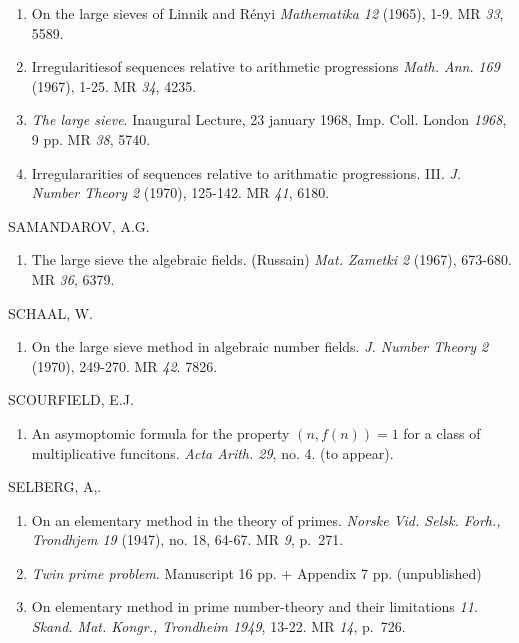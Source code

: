 \begin{thebibliography}{99}
\begin{enumerate}
\item On the  large sieves of Linnik and R\'{e}nyi
  \textit{Mathematika 12} (1965), 1-9. MR {\em 33}, 5589. 

\item Irregularities\pageoriginale of sequences relative to arithmetic
  progressions 
  \textit{Math. Ann.} {\em 169} (1967), 1-25. MR  {\em 34}, 4235.  

\item \textit{The large sieve}. Inaugural Lecture, 23 january
  1968, Imp. Coll. London {\em 1968}, 9 pp. MR {\em 38}, 5740. 

\item Irregulararities of sequences relative to arithmatic
  progressions. III. \textit{J. Number Theory 2} (1970),
  125-142. MR {\em 41}, 6180. 
\end{enumerate}

 SAMANDAROV, A.G. 
\begin{enumerate}
\item The large sieve the algebraic fields. (Russain)
  \textit{Mat. Zametki 2} (1967), 673-680. MR {\em 36}, 6379. 
\end{enumerate}

 SCHAAL, W. 
\begin{enumerate}
\item On the large sieve method in algebraic number
  fields. \textit{J. Number Theory 2} (1970), 249-270. MR {\em
    42}. 7826. 
\end{enumerate}

 SCOURFIELD, E.J.
\begin{enumerate}
\item An asymoptomic formula for the property $(n, f(n))=1$ for a
  class of multiplicative funcitons. \textit{Acta Arith. 29},
  no. 4. (to appear). 
\end{enumerate}

 SELBERG, A,.
\begin{enumerate}
\item On an elementary method in the theory of primes. \textit{Norske
  Vid. Selsk. Forh., Trondhjem 19} (1947), no. 18, 64-67. MR {\em 9},
  p.~271. 

\item \textit{Twin prime problem}.  Manuscript 16 pp. + Appendix 7
  pp. (unpublished)
 
\item On elementary method in prime number-theory and their
  limitations {\em 11. Skand. Mat. Kongr., Trondheim 1949}, 13-22.  MR
  {\em 14}, p.~726.
 

\end{enumerate}
\end{thebibliography}

